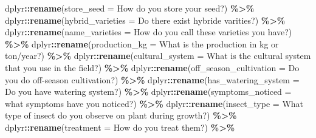 \documentclass[
]{book}
\newenvironment{Shaded}{\begin{snugshade}}{\end{snugshade}}
\newcommand{\AttributeTok}[1]{\textcolor[rgb]{0.13,0.29,0.53}{#1}}
\newcommand{\FunctionTok}[1]{\textcolor[rgb]{0.13,0.29,0.53}{\textbf{#1}}}
\newcommand{\NormalTok}[1]{#1}
\newcommand{\SpecialCharTok}[1]{\textcolor[rgb]{0.81,0.36,0.00}{\textbf{#1}}}
\newcommand{\StringTok}[1]{\textcolor[rgb]{0.31,0.60,0.02}{#1}}
\begin{document}
\begin{Shaded}
\begin{Highlighting}[]
\NormalTok{  dplyr}\SpecialCharTok{::}\FunctionTok{rename}\NormalTok{(}\AttributeTok{store\_seed =} \StringTok{\textasciigrave{}}\AttributeTok{How do you store your seed?}\StringTok{\textasciigrave{}}\NormalTok{) }\SpecialCharTok{\%\textgreater{}\%}
\NormalTok{  dplyr}\SpecialCharTok{::}\FunctionTok{rename}\NormalTok{(}\AttributeTok{hybrid\_varieties =} \StringTok{\textasciigrave{}}\AttributeTok{Do there exist hybride varities?}\StringTok{\textasciigrave{}}\NormalTok{) }\SpecialCharTok{\%\textgreater{}\%}
\NormalTok{  dplyr}\SpecialCharTok{::}\FunctionTok{rename}\NormalTok{(}\AttributeTok{name\_varieties =} \StringTok{\textasciigrave{}}\AttributeTok{How do you call these varieties you have?}\StringTok{\textasciigrave{}}\NormalTok{) }\SpecialCharTok{\%\textgreater{}\%}
\NormalTok{  dplyr}\SpecialCharTok{::}\FunctionTok{rename}\NormalTok{(}\AttributeTok{production\_kg =} \StringTok{\textasciigrave{}}\AttributeTok{What is the production in kg or ton/year?}\StringTok{\textasciigrave{}}\NormalTok{) }\SpecialCharTok{\%\textgreater{}\%}
\NormalTok{  dplyr}\SpecialCharTok{::}\FunctionTok{rename}\NormalTok{(}\AttributeTok{cultural\_system =} \StringTok{\textasciigrave{}}\AttributeTok{What is the cultural system that you use in the field?}\StringTok{\textasciigrave{}}\NormalTok{) }\SpecialCharTok{\%\textgreater{}\%}
\NormalTok{  dplyr}\SpecialCharTok{::}\FunctionTok{rename}\NormalTok{(}\AttributeTok{off\_season\_cultivation =} \StringTok{\textasciigrave{}}\AttributeTok{Do you do off{-}season cultivation?}\StringTok{\textasciigrave{}}\NormalTok{) }\SpecialCharTok{\%\textgreater{}\%}
\NormalTok{  dplyr}\SpecialCharTok{::}\FunctionTok{rename}\NormalTok{(}\AttributeTok{has\_watering\_system =} \StringTok{\textasciigrave{}}\AttributeTok{Do you have watering system?}\StringTok{\textasciigrave{}}\NormalTok{) }\SpecialCharTok{\%\textgreater{}\%}
\NormalTok{  dplyr}\SpecialCharTok{::}\FunctionTok{rename}\NormalTok{(}\AttributeTok{symptoms\_noticed =} \StringTok{\textasciigrave{}}\AttributeTok{what symptoms have you noticed?}\StringTok{\textasciigrave{}}\NormalTok{) }\SpecialCharTok{\%\textgreater{}\%}
\NormalTok{  dplyr}\SpecialCharTok{::}\FunctionTok{rename}\NormalTok{(}\AttributeTok{insect\_type =} \StringTok{\textasciigrave{}}\AttributeTok{What type of insect do you observe on plant during growth?}\StringTok{\textasciigrave{}}\NormalTok{) }\SpecialCharTok{\%\textgreater{}\%}
\NormalTok{  dplyr}\SpecialCharTok{::}\FunctionTok{rename}\NormalTok{(}\AttributeTok{treatment =} \StringTok{\textasciigrave{}}\AttributeTok{How do you treat them?}\StringTok{\textasciigrave{}}\NormalTok{) }\SpecialCharTok{\%\textgreater{}\%}

\end{Highlighting}
\end{Shaded}
\end{document}
